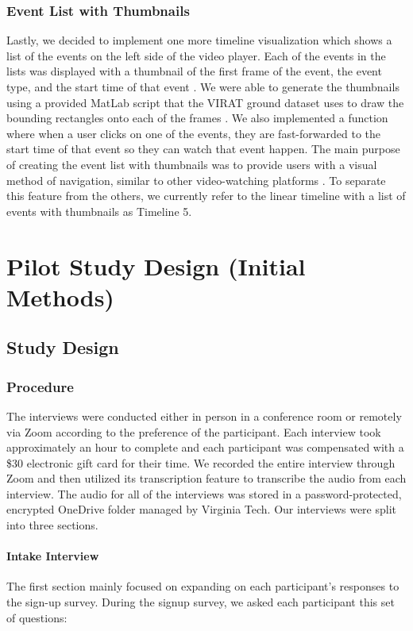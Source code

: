 \documentclass[doublespace,draft,nopageskip]{VTthesis} %
\begin{document}
\subsection{Event List with Thumbnails}
Lastly, we decided to implement one more timeline visualization which shows a list of the events on the left side of the video player. Each of the events in the lists was displayed with a thumbnail of the first frame of the event, the event type, and the start time of that event \cite{hoeberBrowseLine2DTimeline2009, yanTwoDimensionalTimeline2004, brehmerTimelinesRevisitedDesign2017}. We were able to generate the thumbnails using a provided MatLab script that the VIRAT ground dataset uses to draw the bounding rectangles onto each of the frames \cite{VIRATVideoData}. We also implemented a function where when a user clicks on one of the events, they are fast-forwarded to the start time of that event so they can watch that event happen. The main purpose of creating the event list with thumbnails was to provide users with a visual method of navigation, similar to other video-watching platforms \cite{YouTube}. To separate this feature from the others, we currently refer to the linear timeline with a list of events with thumbnails as Timeline 5.

\chapter{Pilot Study Design (Initial Methods)} \label{ch:pilot_study}
\section{Study Design} \label{se:one_section}
\subsection{Procedure}

The interviews were conducted either in person in a conference room or remotely via Zoom according to the preference of the participant. Each interview took approximately an hour to complete and each participant was compensated with a \$30 electronic gift card for their time. We recorded the entire interview through Zoom and then utilized its transcription feature to transcribe the audio from each interview. The audio for all of the interviews was stored in a password-protected, encrypted OneDrive folder managed by Virginia Tech. Our interviews were split into three sections. 

\subsubsection{Intake Interview} 
The first section mainly focused on expanding on each participant's responses to the sign-up survey. During the signup survey, we asked each participant this set of questions:
\end{document}
